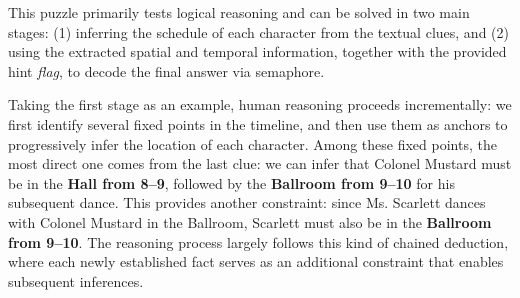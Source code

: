 





This puzzle primarily tests logical reasoning and can be solved in two main stages: (1) inferring the schedule of each character from the textual clues, and (2) using the extracted spatial and temporal information, together with the provided hint \textit{flag}, to decode the final answer via semaphore. 

Taking the first stage as an example, human reasoning proceeds incrementally: we first identify several fixed points in the timeline, and then use them as anchors to progressively infer the location of each character. Among these fixed points, the most direct one comes from the last clue: we can infer that Colonel Mustard must be in the \textbf{Hall from 8--9}, followed by the \textbf{Ballroom from 9--10} for his subsequent dance. This provides another constraint: since Ms. Scarlett dances with Colonel Mustard in the Ballroom, Scarlett must also be in the \textbf{Ballroom from 9--10}. The reasoning process largely follows this kind of chained deduction, where each newly established fact serves as an additional constraint that enables subsequent inferences.

